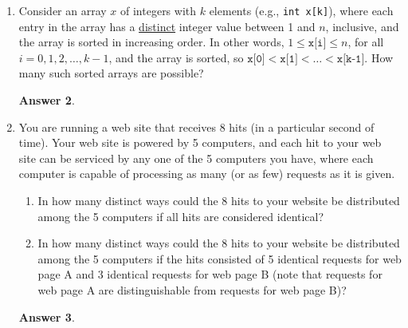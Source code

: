 \documentclass[12pt]{article}
\renewcommand{\(}{\left(}
\renewcommand{\)}{\right)}
\theoremstyle{definition}
\newtheorem*{answer}{Answer}
\begin{document}
\begin{enumerate}
    \begin{shaded}
    \begin{answer}

    \end{answer}
    \end{shaded}
    \newpage


\item Consider an array $x$ of integers with $k$ elements (e.g., \texttt{int x[k]}), where each entry in the array has a \underline{distinct} integer value between 1 and $n$, inclusive, and the array is sorted in increasing order. In other words, $1 \leq \texttt{x[i]} \leq n$, for all $i = 0, 1, 2, \dotsc, k - 1$, and the array is sorted, so $\texttt{x[0]} < \texttt{x[1]} < \dotsc < \texttt{x[k-1]}$.  How many such sorted arrays are possible?

    \begin{shaded}
    \begin{answer}

    \end{answer}
    \end{shaded}
    \newpage


\item You are running a web site that receives 8 hits (in a particular second of time).  Your web site is powered by 5 computers, and each hit to your web site can be serviced by any one of the 5 computers you have, where each computer is capable of processing as many (or as few) requests as it is given.
    \begin{enumerate}[label=\alph*.]

    \item In how many distinct ways could the 8 hits to your website be distributed among the 5 computers if all hits are considered identical?
    \item In how many distinct ways could the 8 hits to your website be distributed among the 5 computers if the hits consisted of 5 identical requests for web page A and 3 identical requests for web page B (note that requests for web page A are distinguishable from requests for web page B)?

    \end{enumerate}

    \begin{shaded}
    \begin{answer}

    \end{answer}
    \end{shaded}
    \newpage



\end{enumerate}
\end{document}
